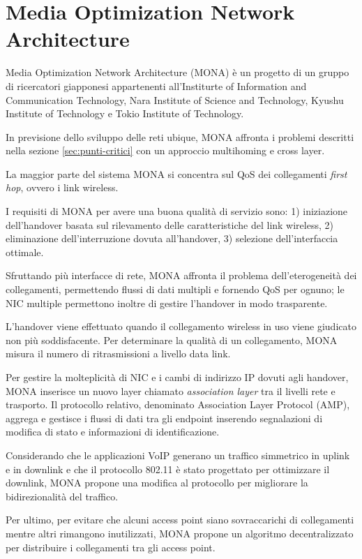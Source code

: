 \documentclass[12pt,a4paper,openright,twoside,draft]{book}
\begin{document}
\clearpage{\pagestyle{empty}\cleardoublepage}


\chapter{Media Optimization Network Architecture}
\label{cha:mona}
Media Optimization Network Architecture (MONA) è un progetto di un
gruppo di ricercatori giapponesi appartenenti all'Institurte of
Information and Communication Technology, Nara Institute of Science
and Technology, Kyushu Institute of Technology e Tokio Institute of
Technology.

In previsione dello sviluppo delle reti ubique, MONA affronta i
problemi descritti nella sezione \ref{sec:punti-critici} con un
approccio multihoming e cross layer.

La maggior parte del sistema MONA si concentra sul QoS dei
collegamenti \emph{first hop}, ovvero i link wireless.

I requisiti di MONA per avere una buona qualità di servizio sono:
1) iniziazione dell'handover basata sul rilevamento delle
caratteristiche del link wireless, 2) eliminazione dell'interruzione
dovuta all'handover, 3) selezione dell'interfaccia ottimale.

Sfruttando più interfacce di rete, MONA affronta il problema
dell'eterogeneità dei collegamenti, permettendo flussi di dati
multipli e fornendo QoS per ognuno; le NIC multiple permettono inoltre
di gestire l'handover in modo trasparente.

L'handover viene effettuato quando il collegamento wireless in uso
viene giudicato non più soddisfacente. Per determinare la qualità di
un collegamento, MONA misura il numero di ritrasmissioni a livello
data link.

Per gestire la molteplicità di NIC e i cambi di indirizzo IP dovuti
agli handover, MONA inserisce un nuovo layer chiamato
\emph{association layer} tra il livelli rete e trasporto. Il
protocollo relativo, denominato Association Layer Protocol (AMP),
aggrega e gestisce i flussi di dati tra gli endpoint inserendo
segnalazioni di modifica di stato e informazioni di identificazione.

Considerando che le applicazioni VoIP generano un traffico simmetrico
in uplink e in downlink e che il protocollo 802.11 è stato progettato
per ottimizzare il downlink, MONA propone una modifica al protocollo
per migliorare la bidirezionalità del traffico.

Per ultimo, per evitare che alcuni access point siano sovraccarichi di
collegamenti mentre altri rimangono inutilizzati, MONA propone un
algoritmo decentralizzato per distribuire i collegamenti tra gli
access point.
\end{document}
